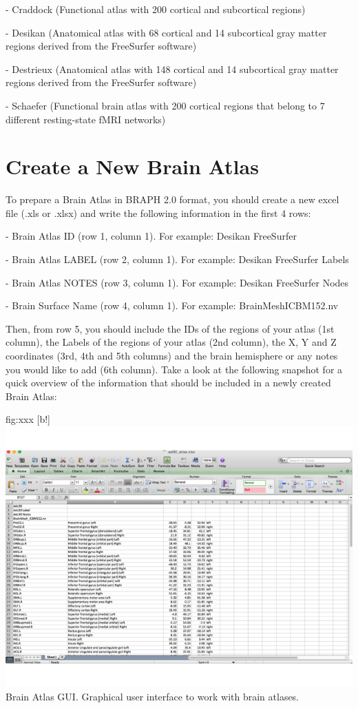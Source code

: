 \documentclass{tufte-handout}
\begin{document}
- Craddock (Functional atlas with 200 cortical and subcortical regions)


- Desikan (Anatomical atlas with 68 cortical and 14 subcortical gray matter regions derived from the FreeSurfer software)


-  Destrieux (Anatomical atlas with 148 cortical and 14 subcortical gray matter regions derived from the FreeSurfer software)


- Schaefer (Functional brain atlas with 200 cortical regions that belong to 7 different resting-state fMRI networks)




\section{Create a New Brain Atlas}

To prepare a Brain Atlas in BRAPH 2.0 format, you should create a new excel file (.xls or .xlsx) and write the following information in the first 4 rows:

- Brain Atlas ID (row 1, column 1).
For example: Desikan FreeSurfer


- Brain Atlas LABEL (row 2, column 1).
For example: Desikan FreeSurfer Labels


- Brain Atlas NOTES (row 3, column 1).
For example: Desikan FreeSurfer Nodes


- Brain Surface Name (row 4, column 1).
For example: BrainMeshICBM152.nv


Then, from row 5, you should include the IDs of the regions of your atlas (1st column), the Labels of the regions of your atlas (2nd column), the X, Y and Z coordinates (3rd, 4th and 5th columns) and the brain hemisphere or any notes you would like to add (6th column). Take a look at the following snapshot for a quick overview of the information that should be included in a newly created Brain Atlas:


	{fig:xxx}
	{
	[b!]
	\includegraphics{tut_ba/fig9.png}
	}
	{Brain Atlas GUI.}
	{
	Graphical user interface to work with brain atlases. 
	}
	
\end{document}
